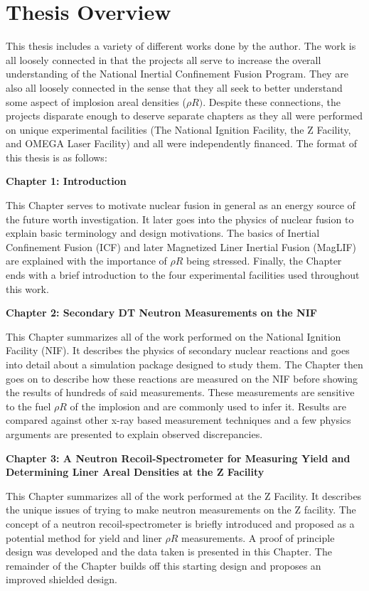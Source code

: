 \section*{Thesis Overview}

This thesis includes a variety of different works done by the author. The work is all loosely connected in that the projects all serve to increase the overall understanding of the National Inertial Confinement Fusion Program. They are also all loosely connected in the sense that they all seek to better understand some aspect of implosion areal densities ($\rho R)$. Despite these connections, the projects disparate enough to deserve separate chapters as they all were performed on unique experimental facilities (The National Ignition Facility, the Z Facility, and OMEGA Laser Facility) and all were independently financed. The format of this thesis is as follows:

\textbf{Chapter 1: Introduction} 

This Chapter serves to motivate nuclear fusion in general as an energy source of the future worth investigation. It later goes into the physics of nuclear fusion to explain basic terminology and design motivations. The basics of Inertial Confinement Fusion (ICF) and later Magnetized Liner Inertial Fusion (MagLIF) are explained with the importance of $\rho R$ being stressed. Finally, the Chapter ends with a brief introduction to the four experimental facilities used throughout this work.

\textbf{Chapter 2: Secondary DT Neutron Measurements on the NIF}

This Chapter summarizes all of the work performed on the National Ignition Facility (NIF). It describes the physics of secondary nuclear reactions and goes into detail about a simulation package designed to study them. The Chapter then goes on to describe how these reactions are measured on the NIF before showing the results of hundreds of said measurements. These measurements are sensitive to the fuel $\rho R$ of the implosion and are commonly used to infer it. Results are compared against other x-ray based measurement techniques and a few physics arguments are presented to explain observed discrepancies. 

\textbf{Chapter 3: A Neutron Recoil-Spectrometer for Measuring Yield and Determining Liner Areal Densities at the Z Facility}

This Chapter summarizes all of the work performed at the Z Facility. It describes the unique issues of trying to make neutron measurements on the Z facility. The concept of a neutron recoil-spectrometer is briefly introduced and proposed as a potential method for yield and liner $\rho R$ measurements. A proof of principle design was developed and the data taken is presented in this Chapter. The remainder of the Chapter builds off this starting design and proposes an improved shielded design. 


